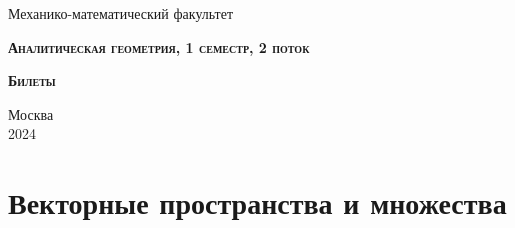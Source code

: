\documentclass[a4paper, 12pt]{article}
\theoremstyle{definition}
\begin{document}
	\begin{titlepage}
		\newpage
		
		\begin{center}
		\end{center}
		
		\vspace{4em}
		
		\begin{center}
			\Large Механико-математический факультет  
		\end{center}
		
		\vspace{2em}
		
		\begin{center}
			\large{\textsc{\textbf{Аналитическая геометрия, 1 семестр, 2 поток}}}

			\vspace{6em}

			\large{\textsc{\textbf{Билеты}}}
		\end{center}
		
		\vspace{\fill}
		
		\begin{center}
			Москва \\2024 
		\end{center}
	\end{titlepage}
	\tableofcontents
	\fontsize{14pt}{20pt}\selectfont
	\newpage
	\fontsize{14pt}{20pt}\selectfont
	\section{Векторные пространства и множества}
\end{document}
